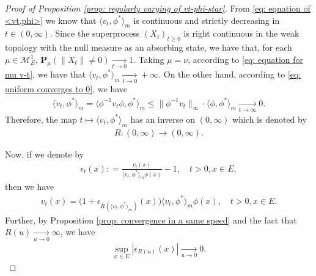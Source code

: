 \documentclass[12pt,a4paper]{amsart}
\theoremstyle{definition}
\numberwithin{equation}{section}
\begin{document}
\begin{proof}
  [Proof of Proposition \ref{prop: regularly varying of vt-phi-star}]
	From \eqref{eq: equation of <vt,phi>} we know that $\langle v_t,\phi^* \rangle_m$ is continuous and strictly decreasing in $t \in (0,\infty)$.
	Since the superprocess $(X_t)_{t\geq 0}$ is right continuous in the weak topology with the null measure as an absorbing state, we have that, for each $\mu \in \mathcal M_E^1$, $\mathbf P_\mu (\|X_t\| \neq 0) \xrightarrow[t\to 0]{} 1$.
	Taking $\mu = \nu$, according to \eqref{eq: equation for mu v-t}, we have that $\langle v_{t}, \phi^*\rangle_m \xrightarrow[t\to 0]{} +\infty$.
	On the other hand, according to \eqref{eq: uniform converges to 0}, we have
\begin{align}
  \langle v_{t}, \phi^*\rangle_m
  = \langle \phi^{-1} v_t \phi, \phi^*\rangle_m
  \leq \|\phi^{-1} v_t\|_\infty \cdot \langle \phi, \phi^* \rangle_m
 \xrightarrow[t\to \infty]{} 0.
\end{align}
	  Therefore, the map $t\mapsto \langle v_t,\phi^*  \rangle_m$ has an inverse on $(0,\infty)$ which is denoted by
\begin{align}
	R: (0,\infty) \to (0,\infty).
\end{align}
	
Now, if we denote by
\begin{align}
	\epsilon_{t}(x)
	: = \frac{v_t(x)}{\langle v_t, \phi^*\rangle_m \phi(x)} - 1,
	\quad t>0, x\in E,
\end{align}
then we have
\begin{align}\label{eq: change variable using inverse}
	v_t(x)
	= \big(1+ \epsilon_{R(\langle v_t,\phi^* \rangle_m)}(x) \big )\langle v_t,\phi^* \rangle_m \phi(x),
	\quad t>0, x\in E.
\end{align}
Further, by Proposition \ref{prop: convergence in a same speed} and the fact that $R(u)\xrightarrow[u\to 0]{} \infty$, we have
  \begin{align}\label{eq: epsilon R converges to 0}
    \sup_{x\in E}|\epsilon_{R(u)}(x)|
    \xrightarrow[u\to 0]{} 0.
  \end{align}


\end{proof}
\end{document}
